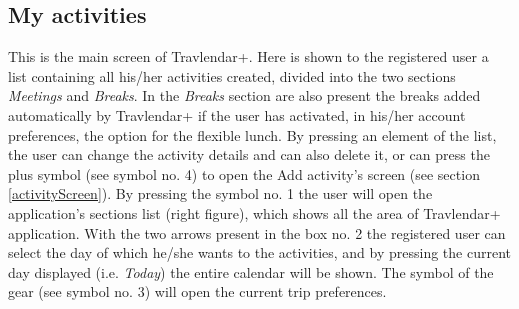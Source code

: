\documentclass[12pt,titlepage]{article}
\begin{document}
\subsection{My activities}
This is the main screen of Travlendar+. Here is shown to the registered user a list containing all his/her activities created, divided into the two sections \textit{Meetings} and \textit{Breaks}. In the \textit{Breaks} section are also present the breaks added automatically by Travlendar+ if the user has activated, in his/her account preferences, the option for the flexible lunch. By pressing an element of the list, the user can change the activity details and can also delete it, or can press the plus symbol (see symbol no. 4) to open the Add activity's screen (see section \ref{activityScreen}).
By pressing the symbol no. 1 the user will open the application's sections list (right figure), which shows all the area of Travlendar+ application. With the two arrows present in the box no. 2 the registered user can select the day of which he/she wants to the activities, and by pressing the current day displayed (i.e. \textit{Today}) the entire calendar will be shown. The symbol of the gear (see symbol no. 3) will open the current trip preferences.
\end{document}
